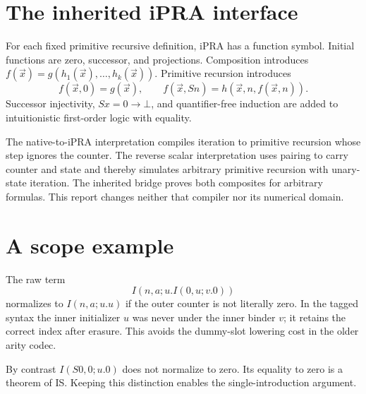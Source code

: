 \documentclass[11pt]{article}
\begin{document}
\appendix
\section{The inherited iPRA interface}
For each fixed primitive recursive definition, iPRA has a function
symbol. Initial functions are zero, successor, and projections.
Composition introduces
\(f(\vec x)=g(h_1(\vec x),\ldots,h_k(\vec x))\).
Primitive recursion introduces
\[
 f(\vec x,0)=g(\vec x),\qquad
 f(\vec x,Sn)=h(\vec x,n,f(\vec x,n)).
\]
Successor injectivity, \(Sx=0\to\bot\), and quantifier-free induction
are added to intuitionistic first-order logic with equality.

The native-to-iPRA interpretation compiles iteration to primitive
recursion whose step ignores the counter. The reverse scalar
interpretation uses pairing to carry counter and state and thereby
simulates arbitrary primitive recursion with unary-state iteration.
The inherited bridge proves both composites for arbitrary formulas.
This report changes neither that compiler nor its numerical domain.

\section{A scope example}
The raw term
\[
                       I(n,a;u.I(0,u;v.0))
\]
normalizes to \(I(n,a;u.u)\) if the outer counter is not literally zero.
In the tagged syntax the inner initializer \(u\) was never under the
inner binder \(v\); it retains the correct index after erasure.
This avoids the dummy-slot lowering cost in the older arity codec.

By contrast \(I(S0,0;u.0)\) does not normalize to zero. Its equality
to zero is a theorem of IS. Keeping this distinction enables the
single-introduction argument.
\end{document}
